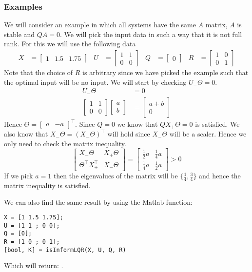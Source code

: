\subsubsection{Examples}
We will consider an example in which all systems have the same $A$ matrix, $A$ is stable and $QA = 0$. We will pick the input data in such a way that it is not full rank. For this we will use the following data
\begin{align*}
X &= \begin{bmatrix} 1&1.5&1.75 \end{bmatrix} & 
U &= \begin{bmatrix} 1&1\\0&0 \end{bmatrix} & 
Q &= \begin{bmatrix} 0 \end{bmatrix} &
R &= \begin{bmatrix} 1&0\\0&1 \end{bmatrix}
\end{align*} 
Note that the choice of $R$ is arbitrary since we have picked the example such that the optimal input will be no input. We will start by checking $U_- \Theta = 0$.
\begin{align*}
U_- \Theta &= 0 \\
\begin{bmatrix} 1&1\\0&0 \end{bmatrix}\begin{bmatrix} a\\b \end{bmatrix} &= \begin{bmatrix} a + b\\0 \end{bmatrix}
\end{align*}
Hence $\Theta = \begin{bmatrix} a & -a \end{bmatrix}^\top$. Since $Q = 0$ we know that $QX_+\Theta = 0$ is satisfied. We also know that $X_-\Theta = (X_-\Theta)^\top$ will hold since $X_-\Theta$ will be a scaler. Hence we only need to check the matrix inequality.
\[ \begin{bmatrix} X_-\Theta & X_+\Theta \\ \Theta^\top X_+^\top & X_-\Theta \end{bmatrix} = 
\begin{bmatrix} \frac{1}{2} a & \frac{1}{4} a \\ \frac{1}{4} a & \frac{1}{2} a \end{bmatrix}
 > 0 \]
If we pick $a = 1$ then the eigenvalues of the matrix will be $\{\frac{1}{4}, \frac{3}{4}\}$ and hence the matrix inequality is satisfied.


We can also find the same result by using the Matlab function:
\begin{lstlisting}
X = [1 1.5 1.75];
U = [1 1 ; 0 0];
Q = [0];
R = [1 0 ; 0 1];
[bool, K] = isInformLQR(X, U, Q, R)
\end{lstlisting}
Which will return: \mon{[ 1, [0 ; 0] ]}.
